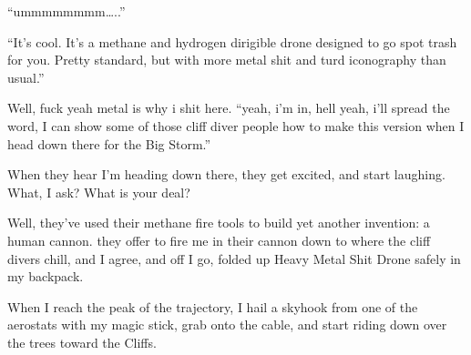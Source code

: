 ``ummmmmmmm\ldots{}..''

``It's cool. It's a methane and hydrogen dirigible drone designed to go
spot trash for you. Pretty standard, but with more metal shit and turd
iconography than usual.''

Well, fuck yeah metal is why i shit here. ``yeah, i'm in, hell yeah,
i'll spread the word, I can show some of those cliff diver people how to
make this version when I head down there for the Big Storm.''

When they hear I'm heading down there, they get excited, and start
laughing. What, I ask? What is your deal?

Well, they've used their methane fire tools to build yet another
invention: a human cannon. they offer to fire me in their cannon down to
where the cliff divers chill, and I agree, and off I go, folded up Heavy
Metal Shit Drone safely in my backpack.

When I reach the peak of the trajectory, I hail a skyhook from one of
the aerostats with my magic stick, grab onto the cable, and start riding
down over the trees toward the Cliffs.
